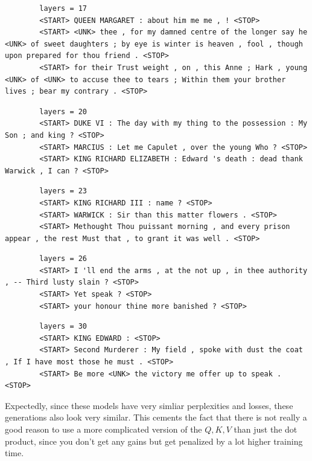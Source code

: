 \documentclass[12pt]{article}
\theoremstyle{definitionstyle}
\begin{document}
    \begin{lstlisting}
        layers = 17
        <START> QUEEN MARGARET : about him me me , ! <STOP>
        <START> <UNK> thee , for my damned centre of the longer say he <UNK> of sweet daughters ; by eye is winter is heaven , fool , though upon prepared for thou friend . <STOP>
        <START> for their Trust weight , on , this Anne ; Hark , young <UNK> of <UNK> to accuse thee to tears ; Within them your brother lives ; bear my contrary . <STOP>
    \end{lstlisting}
    \begin{lstlisting}
        layers = 20
        <START> DUKE VI : The day with my thing to the possession : My Son ; and king ? <STOP>
        <START> MARCIUS : Let me Capulet , over the young Who ? <STOP>
        <START> KING RICHARD ELIZABETH : Edward 's death : dead thank Warwick , I can ? <STOP>
    \end{lstlisting}
    \begin{lstlisting}
        layers = 23
        <START> KING RICHARD III : name ? <STOP>
        <START> WARWICK : Sir than this matter flowers . <STOP>
        <START> Methought Thou puissant morning , and every prison appear , the rest Must that , to grant it was well . <STOP>
    \end{lstlisting}
    \begin{lstlisting}
        layers = 26
        <START> I 'll end the arms , at the not up , in thee authority , -- Third lusty slain ? <STOP>
        <START> Yet speak ? <STOP>
        <START> your honour thine more banished ? <STOP>
    \end{lstlisting}
    \begin{lstlisting}
        layers = 30
        <START> KING EDWARD : <STOP>
        <START> Second Murderer : My field , spoke with dust the coat , If I have most those he must . <STOP>
        <START> Be more <UNK> the victory me offer up to speak . <STOP>
    \end{lstlisting}

    Expectedly, since these models have very simliar perplexities and losses, these generations also look very similar. This cements the fact that there is not really a good reason to use a more complicated version of the $Q, K, V$ than just the dot product, since you don't get any gains but get penalized by a lot higher training time. 
\end{document}
